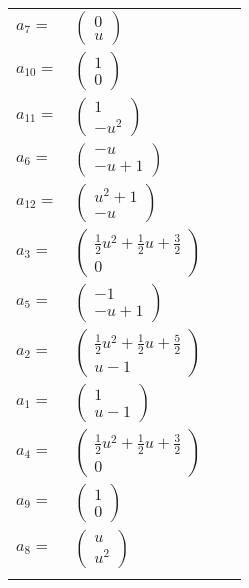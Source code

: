 \documentclass[1p]{elsarticle_modified}
\theoremstyle{definition}
\begin{document}
\begin{tabular}{m{7pt} m{180pt} m{7pt} m{180pt} }
\flushright $a_{7}=$&$\begin{pmatrix}0\\u\end{pmatrix}$ \\
\flushright $a_{10}=$&$\begin{pmatrix}1\\0\end{pmatrix}$ \\
\flushright $a_{11}=$&$\begin{pmatrix}1\\- u^2\end{pmatrix}$ \\
\flushright $a_{6}=$&$\begin{pmatrix}- u\\- u+1\end{pmatrix}$ \\
\flushright $a_{12}=$&$\begin{pmatrix}u^2+1\\- u\end{pmatrix}$ \\
\flushright $a_{3}=$&$\begin{pmatrix}\frac{1}{2} u^2+\frac{1}{2} u+\frac{3}{2}\\0\end{pmatrix}$ \\
\flushright $a_{5}=$&$\begin{pmatrix}-1\\- u+1\end{pmatrix}$ \\
\flushright $a_{2}=$&$\begin{pmatrix}\frac{1}{2} u^2+\frac{1}{2} u+\frac{5}{2}\\u-1\end{pmatrix}$ \\
\flushright $a_{1}=$&$\begin{pmatrix}1\\u-1\end{pmatrix}$ \\
\flushright $a_{4}=$&$\begin{pmatrix}\frac{1}{2} u^2+\frac{1}{2} u+\frac{3}{2}\\0\end{pmatrix}$ \\
\flushright $a_{9}=$&$\begin{pmatrix}1\\0\end{pmatrix}$ \\
\flushright $a_{8}=$&$\begin{pmatrix}u\\u^2\end{pmatrix}$\\&\end{tabular}
\end{document}
